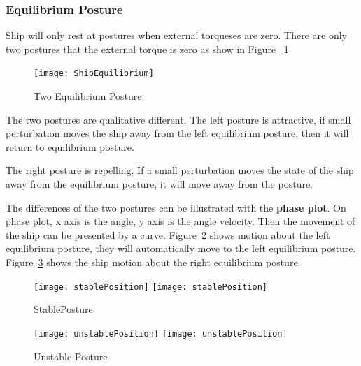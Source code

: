 \subsubsection*{Equilibrium Posture}
Ship will only rest at postures when external torqueses are zero.
There are only two postures that the external torque is zero as show in Figure ~\ref{fig:ShipEqulibrium}
\begin{figure}[!htbp]
  \begin{center}
    \leavevmode
      \texttt{[image: ShipEquilibrium]}
    \caption{Two Equilibrium Posture}
    \label{fig:ShipEqulibrium}
  \end{center}
\end{figure}



The two postures are qualitative different.
The left posture is attractive, if small perturbation moves the ship away from the left equilibrium posture, then it will return to equilibrium posture.

The right posture is repelling.
If a small perturbation moves the state of the ship away from the equilibrium posture, it will move away from the posture.

The differences of the two postures can be illustrated with the \textbf{phase plot}.
On phase plot, x axis is the angle, y axis is the angle velocity. 
Then the movement of the ship can be presented by a curve.
Figure~\ref{fig:StablePosture}  shows motion about the left equilibrium posture, they will automatically move to the left equilibrium posture.
Figure~\ref{fig:unStablePosture} shows the ship motion about the right equilibrium posture.
 
\begin{figure}[!htbp]
  \begin{center}
    \leavevmode
    \ifpdf
      \texttt{[image: stablePosition]}
    \else
      \texttt{[image: stablePosition]}
    \fi
    \caption{StablePosture}
    \label{fig:StablePosture}
  \end{center}
\end{figure}


\begin{figure}[!htbp]
  \begin{center}
    \leavevmode
    \ifpdf
      \texttt{[image: unstablePosition]}
    \else
      \texttt{[image: unstablePosition]}
    \fi
    \caption{Unstable Posture}
    \label{fig:unStablePosture}
  \end{center}
\end{figure}


